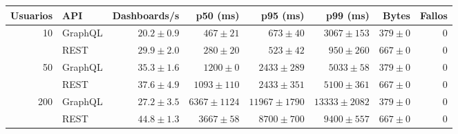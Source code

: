 \begin{tabular}{rlrrrrrr}
\toprule
Usuarios & API & Dashboards/s & p50 (ms) & p95 (ms) & p99 (ms) & Bytes & Fallos \\
\midrule
10 & GraphQL & $20.2\pm0.9$ & $467\pm21$ & $673\pm40$ & $3067\pm153$ & $379\pm0$ & 0 \\
 & REST & $29.9\pm2.0$ & $280\pm20$ & $523\pm42$ & $950\pm260$ & $667\pm0$ & 0 \\
\midrule
50 & GraphQL & $35.3\pm1.6$ & $1200\pm0$ & $2433\pm289$ & $5033\pm58$ & $379\pm0$ & 0 \\
 & REST & $37.6\pm4.9$ & $1093\pm110$ & $2433\pm351$ & $5100\pm361$ & $667\pm0$ & 0 \\
\midrule
200 & GraphQL & $27.2\pm3.5$ & $6367\pm1124$ & $11967\pm1790$ & $13333\pm2082$ & $379\pm0$ & 0 \\
 & REST & $44.8\pm1.3$ & $3667\pm58$ & $8700\pm700$ & $9400\pm557$ & $667\pm0$ & 0 \\
\bottomrule
\end{tabular}